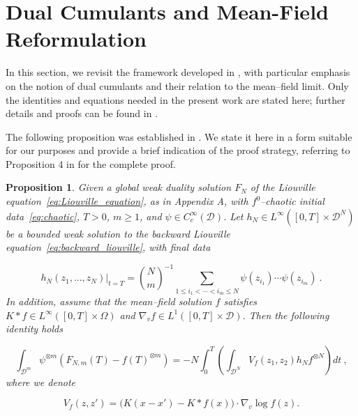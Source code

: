 \documentclass[pdflatex,sn-mathphys-num]{sn-jnl}
\theoremstyle{thmstyleone}%
\newtheorem{proposition}[theorem]{Proposition}%
\theoremstyle{thmstyletwo}%
\theoremstyle{thmstylethree}%
\begin{document}
\section{Dual Cumulants and Mean-Field Reformulation}\label{sec2}

In this section, we revisit the framework developed in \cite{bresch2024duality}, with particular emphasis on the notion of dual cumulants and their relation to the mean--field limit. Only the identities and equations needed in the present work are stated here; further details and proofs can be found in \cite{bresch2024duality}.

\medskip

\noindent
The following proposition was established in \cite{bresch2024duality}. We state it here in a form suitable for our purposes and provide a brief indication of the proof strategy, referring to Proposition 4 in \cite{bresch2024duality} for the complete proof.
\medskip

\begin{proposition}
Given a global weak duality solution $F_N$ of the Liouville equation~\eqref{eq:Liouville_equation}, as in Appendix A, with \(f^0\)--chaotic initial data~\eqref{eq:chaotic}, \(T >0\), \(m \geq 1\), and \(\psi \in C_c^{\infty}(\mathcal{D})\). Let \(h_N \in L^{\infty}\left([0,T] \times \mathcal{D}^N \right)\) be a bounded weak solution to the backward Liouville equation~\eqref{eq:backward_liouville}, with final data 

\begin{equation}\label{final_data_on_h_N}
    h_N(z_1,...,z_N)|_{t=T} = {N \choose m}^{-1} \sum_{1 \leq i_1 < \cdots<i_m \leq N} \psi(z_{i_1})\cdots \psi(z_{i_m}) \ .
\end{equation}
In addition, assume that the mean--field solution \(f\) satisfies \(K * f \in L^{\infty} \left([0,T] \times \Omega \right)\) and \(\nabla_v f \in L^1 \left([0,T] \times \mathcal{D} \right)\). Then the following identity holds 

\begin{equation}\label{prop_identity}
    \int_{\mathcal{D}^m} \psi^{\otimes m} \left(F_{N,m}(T) - f(T)^{\otimes m} \right) = -N \int_0^T \left(\int_{\mathcal{D}^N} V_f(z_1,z_2)h_N f^{\otimes N} \right)dt \ ,
\end{equation}
where we denote 

\begin{equation}\label{V_f_def}
V_{f}(z,z')
= \big( K(x-x') - K \ast f(x) \big)
\cdot \nabla_{v} \log f(z).
\end{equation}
\end{proposition}
\end{document}
